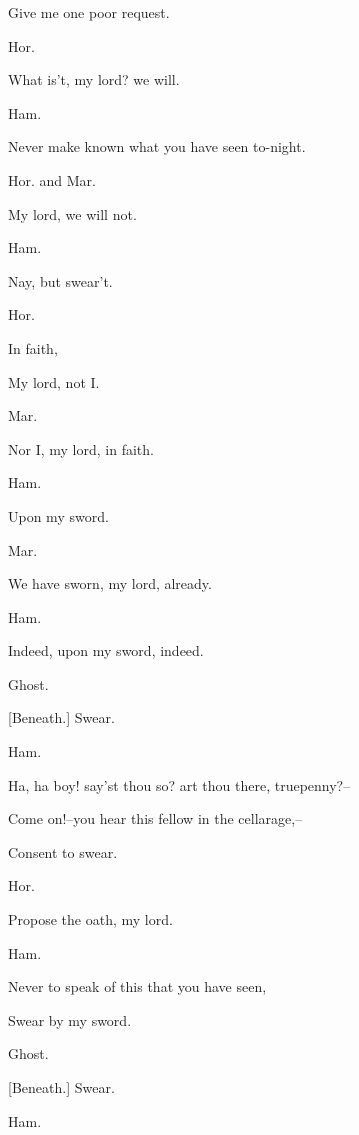 \documentclass[12pt]{book}
\begin{document}
Give me one poor request.



Hor.

What is't, my lord? we will.



Ham.

Never make known what you have seen to-night.



Hor. and Mar.

My lord, we will not.



Ham.

Nay, but swear't.



Hor.

In faith,

My lord, not I.



Mar.

Nor I, my lord, in faith.



Ham.

Upon my sword.



Mar.

We have sworn, my lord, already.



Ham.

Indeed, upon my sword, indeed.



Ghost.

[Beneath.] Swear.



Ham.

Ha, ha boy! say'st thou so? art thou there, truepenny?--

Come on!--you hear this fellow in the cellarage,--

Consent to swear.



Hor.

Propose the oath, my lord.



Ham.

Never to speak of this that you have seen,

Swear by my sword.



Ghost.

[Beneath.] Swear.



Ham.
\end{document}

